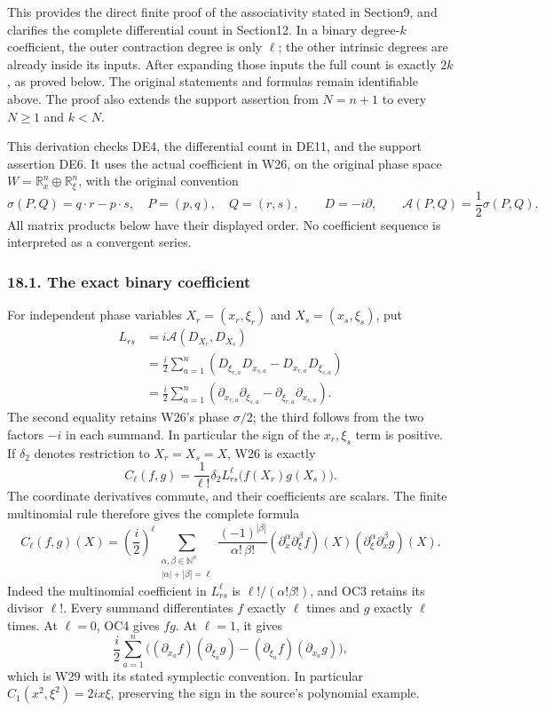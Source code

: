 \documentclass[
  11pt,
]{article}
\begin{document}
This provides the direct finite proof of the associativity stated in
Section9, and clarifies the complete differential count in Section12. In
a binary degree-\(k\) coefficient, the outer contraction degree is only
\(\ell\); the other intrinsic degrees are already inside its inputs.
After expanding those inputs the full count is exactly \(2k\), as proved
below. The original statements and formulas remain identifiable above.
The proof also extends the support assertion from \(N=n+1\) to every
\(N\geq1\) and \(k<N\).

This derivation checks DE4, the differential count in DE11, and the
support assertion DE6. It uses the actual coefficient in W26, on the
original phase space \(W=\mathbb R_x^n\oplus\mathbb R_\xi^n\), with the
original convention \[
\sigma(P,Q)=q\cdot r-p\cdot s,
\quad P=(p,q),\quad Q=(r,s),\qquad D=-i\partial,
\qquad \mathcal A(P,Q)=\frac12\sigma(P,Q).
\tag{OC1}
\] All matrix products below have their displayed order. No coefficient
sequence is interpreted as a convergent series.

\subsubsection{18.1. The exact binary
coefficient}\label{the-exact-binary-coefficient}

For independent phase variables \(X_r=(x_r,\xi_r)\) and
\(X_s=(x_s,\xi_s)\), put \[
\begin{aligned}
L_{rs}
&=i\mathcal A(D_{X_r},D_{X_s})\\
&=\frac i2\sum_{a=1}^n
  \left(D_{\xi_{r,a}}D_{x_{s,a}}
        -D_{x_{r,a}}D_{\xi_{s,a}}\right)\\
&=\frac i2\sum_{a=1}^n
  \left(\partial_{x_{r,a}}\partial_{\xi_{s,a}}
        -\partial_{\xi_{r,a}}\partial_{x_{s,a}}\right).
\end{aligned}
\tag{OC2}
\] The second equality retains W26's phase \(\sigma/2\); the third
follows from the two factors \(-i\) in each summand. In particular the
sign of the \(x_r,\xi_s\) term is positive. If \(\delta_2\) denotes
restriction to \(X_r=X_s=X\), W26 is exactly \[
C_\ell(f,g)=\frac1{\ell!}\delta_2
                L_{rs}^{\ell}\bigl(f(X_r)g(X_s)\bigr).
\tag{OC3}
\] The coordinate derivatives commute, and their coefficients are
scalars. The finite multinomial rule therefore gives the complete
formula \[
C_\ell(f,g)(X)
=\left(\frac i2\right)^\ell
 \sum_{\substack{\alpha,\beta\in\mathbb N^n\\
                 |\alpha|+|\beta|=\ell}}
 \frac{(-1)^{|\beta|}}{\alpha!\,\beta!}
 (\partial_x^\alpha\partial_\xi^\beta f)(X)
 (\partial_\xi^\alpha\partial_x^\beta g)(X).
\tag{OC4}
\] Indeed the multinomial coefficient in \(L_{rs}^\ell\) is
\(\ell!/(\alpha!\beta!)\), and OC3 retains its divisor \(\ell!\). Every
summand differentiates \(f\) exactly \(\ell\) times and \(g\) exactly
\(\ell\) times. At \(\ell=0\), OC4 gives \(fg\). At \(\ell=1\), it gives
\[
\frac i2\sum_{a=1}^n
\bigl((\partial_{x_a}f)(\partial_{\xi_a}g)
      -(\partial_{\xi_a}f)(\partial_{x_a}g)\bigr),
\tag{OC5}
\] which is W29 with its stated symplectic convention. In particular
\(C_1(x^2,\xi^2)=2ix\xi\), preserving the sign in the source's
polynomial example.
\end{document}
